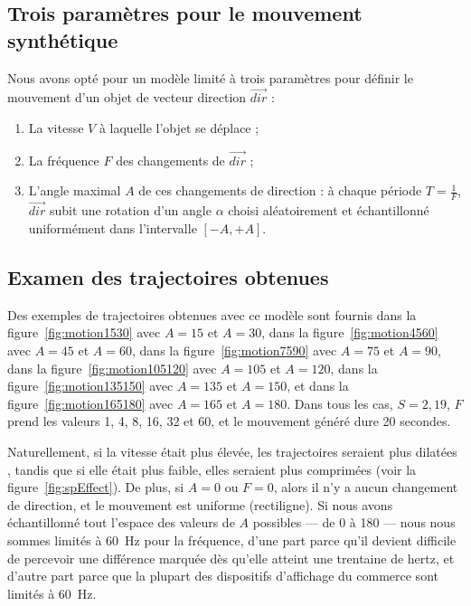 	\FloatBarrier \subsection{Trois paramètres pour le mouvement synthétique}
	Nous avons opté pour un modèle limité à trois paramètres pour définir le mouvement d'un objet de vecteur direction $\vec{dir}$ :
	\begin{enumerate}
		\item La vitesse $V$ à laquelle l'objet se déplace ;
		\item La fréquence $F$ des changements de $\vec{dir}$ ;
		\item L'angle maximal $A$ de ces changements de direction : à chaque période $T = \frac{1}{F}$, $\vec{dir}$ subit une rotation d'un angle $\alpha$ choisi aléatoirement et échantillonné uniformément dans l'intervalle $[-A, +A]$.
	\end{enumerate}
	
	\FloatBarrier \subsection{Examen des trajectoires obtenues}
	Des exemples de trajectoires obtenues avec ce modèle sont fournis dans la figure~\ref{fig:motion1530} avec $A=15$ et $A=30$, dans la figure~\ref{fig:motion4560} avec $A=45$ et $A=60$, dans la figure~\ref{fig:motion7590} avec $A=75$ et $A=90$, dans la figure~\ref{fig:motion105120} avec $A=105$ et $A=120$, dans la figure~\ref{fig:motion135150} avec $A=135$ et $A=150$, et dans la figure~\ref{fig:motion165180} avec $A=165$ et $A=180$. Dans tous les cas, $S=2,19$, $F$ prend les valeurs 1, 4, 8, 16, 32 et 60, et le mouvement généré dure 20 secondes.
	
	Naturellement, si la vitesse était plus élevée, les trajectoires seraient plus \og dilatées \fg{}, tandis que si elle était plus faible, elles seraient plus \og comprimées \fg{} (voir la figure~\ref{fig:spEffect}). De plus, si $A=0$ ou $F=0$, alors il n'y a aucun changement de direction, et le mouvement est uniforme (rectiligne). Si nous avons échantillonné tout l'espace des valeurs de $A$ possibles --- de 0 à 180\textdegree{} --- nous nous sommes limités à 60~Hz pour la fréquence, d'une part parce qu'il devient difficile de percevoir une différence marquée dès qu'elle atteint une trentaine de hertz, et d'autre part parce que la plupart des dispositifs d'affichage du commerce sont limités à 60~Hz.	
	
